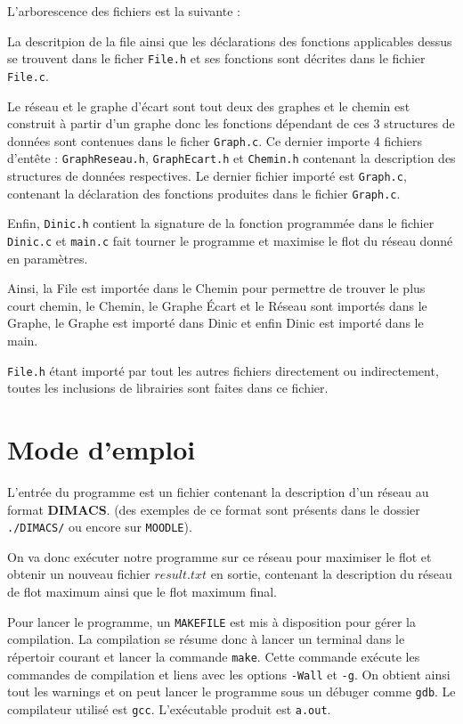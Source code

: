 \documentclass[11pt, a4paper]{report}
\begin{document}
	L'arborescence des fichiers est la suivante :
	
	
	La descritpion de la file ainsi que les déclarations des fonctions applicables dessus se trouvent dans le ficher \verb|File.h| et ses fonctions sont décrites dans le fichier \verb|File.c|.
	
	Le réseau et le graphe d'écart sont tout deux des graphes et le chemin est construit à partir d'un graphe donc les fonctions dépendant de ces 3 structures de données sont contenues dans le ficher \verb|Graph.c|. Ce dernier importe 4 fichiers d'entête : \verb|GraphReseau.h|, \verb|GraphEcart.h| et \verb|Chemin.h| contenant la description des structures de données respectives. Le dernier fichier importé est \verb|Graph.c|, contenant la déclaration des fonctions produites dans le fichier \verb|Graph.c|.
	
	Enfin, \verb|Dinic.h| contient la signature de la fonction programmée dans le fichier \verb|Dinic.c| et \verb|main.c| fait tourner le programme et maximise le flot du réseau donné en paramètres.
	
	Ainsi, la File est importée dans le Chemin pour permettre de trouver le plus court chemin, le Chemin, le Graphe Écart et le Réseau sont importés dans le Graphe, le Graphe est importé dans Dinic et enfin Dinic est importé dans le main.
	
	\verb|File.h| étant importé par tout les autres fichiers directement ou indirectement, toutes les inclusions de librairies sont faites dans ce fichier.
	
	\chapter{Mode d'emploi}
	
	L'entrée du programme est un fichier contenant la description d'un réseau au format \textbf{DIMACS}. (des exemples de ce format sont présents dans le dossier \verb|./DIMACS/| ou encore sur \verb*|MOODLE|).
	
	On va donc exécuter notre programme sur ce réseau pour maximiser le flot et obtenir un nouveau fichier $result.txt$ en sortie, contenant la description du réseau de flot maximum ainsi que le flot maximum final.
	
	Pour lancer le programme, un \verb|MAKEFILE| est mis à disposition pour gérer la compilation. La compilation se résume donc à lancer un terminal dans le répertoir courant et lancer la commande \verb|make|. Cette commande exécute les commandes de compilation et liens avec les options \verb|-Wall| et \verb|-g|. On obtient ainsi tout les warnings et on peut lancer le programme sous un débuger comme \verb|gdb|. Le compilateur utilisé est \verb|gcc|. L'exécutable produit est \verb|a.out|.
	
\end{document}
